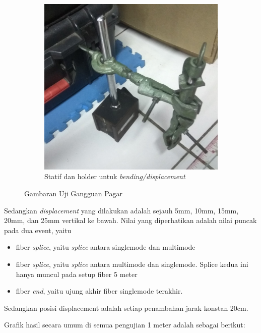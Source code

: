 \documentclass[12pt]{article}
\begin{document}
\begin{figure}[h!]
\begin{subfigure}[b]{0.4\textwidth}
			\includegraphics[width=\linewidth]{images/Bab_4/Bab_4_5c}
			\caption{\small{Statif dan holder untuk \textit{bending/displacement}}}			
		\end{subfigure}
		\caption[Uji Pagar]{\small{Gambaran Uji Gangguan Pagar }}
	\end{figure}

	Sedangkan \textit{displacement} yang dilakukan adalah sejauh 5mm, 10mm, 15mm, 20mm, dan 25mm vertikal ke bawah.
	Nilai yang diperhatikan adalah nilai puncak pada dua event, yaitu
	
	\begin{itemize}
		\item fiber \textit{splice}, yaitu \textit{splice} antara singlemode dan multimode  
		\item fiber \textit{splice}, yaitu \textit{splice} antara multimode dan singlemode.
		Splice kedua ini hanya muncul pada setup fiber 5 meter 
		\item fiber \textit{end}, yaitu ujung akhir fiber singlemode terakhir.
	\end{itemize}

	Sedangkan posisi displacement adalah setiap penambahan jarak konstan 20cm.
	
	Grafik hasil secara umum di semua pengujian 1 meter adalah sebagai berikut:
	
\end{document}
